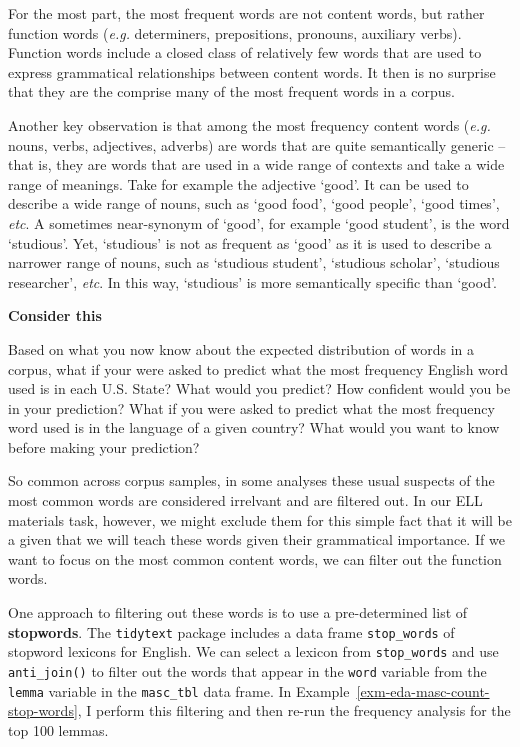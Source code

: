 \documentclass[
  letterpaper,
  DIV=11,
  numbers=noendperiod]{scrreport}
\theoremstyle{definition}
\theoremstyle{remark}
\begin{document}
For the most part, the most frequent words are not content words, but
rather function words (\emph{e.g.} determiners, prepositions, pronouns,
auxiliary verbs). Function words include a closed class of relatively
few words that are used to express grammatical relationships between
content words. It then is no surprise that they are the comprise many of
the most frequent words in a corpus.

Another key observation is that among the most frequency content words
(\emph{e.g.} nouns, verbs, adjectives, adverbs) are words that are quite
semantically generic --that is, they are words that are used in a wide
range of contexts and take a wide range of meanings. Take for example
the adjective `good'. It can be used to describe a wide range of nouns,
such as `good food', `good people', `good times', \emph{etc}. A
sometimes near-synonym of `good', for example `good student', is the
word `studious'. Yet, `studious' is not as frequent as `good' as it is
used to describe a narrower range of nouns, such as `studious student',
`studious scholar', `studious researcher', \emph{etc}. In this way,
`studious' is more semantically specific than `good'.

\begin{tcolorbox}[enhanced jigsaw, breakable, colback=white, rightrule=.15mm, arc=.35mm, left=2mm, toprule=.15mm, leftrule=.75mm, bottomrule=.15mm, opacityback=0]

\textbf{ Consider this}

Based on what you now know about the expected distribution of words in a
corpus, what if your were asked to predict what the most frequency
English word used is in each U.S. State? What would you predict? How
confident would you be in your prediction? What if you were asked to
predict what the most frequency word used is in the language of a given
country? What would you want to know before making your prediction?

\end{tcolorbox}

So common across corpus samples, in some analyses these usual suspects
of the most common words are considered irrelvant and are filtered out.
In our ELL materials task, however, we might exclude them for this
simple fact that it will be a given that we will teach these words given
their grammatical importance. If we want to focus on the most common
content words, we can filter out the function words.

One approach to filtering out these words is to use a pre-determined
list of \textbf{stopwords}. The \texttt{tidytext} package includes a
data frame \texttt{stop\_words} of stopword lexicons for English. We can
select a lexicon from \texttt{stop\_words} and use \texttt{anti\_join()}
to filter out the words that appear in the \texttt{word} variable from
the \texttt{lemma} variable in the \texttt{masc\_tbl} data frame. In
Example~\ref{exm-eda-masc-count-stop-words}, I perform this filtering
and then re-run the frequency analysis for the top 100 lemmas.
\end{document}
